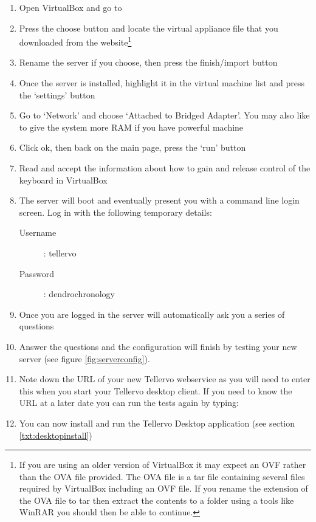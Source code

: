 \begin{enumerate}
 \item Open VirtualBox and go to 
 \item Press the choose button and locate the virtual appliance file that you downloaded from the website\footnote{If you are using an older version of VirtualBox it may expect an OVF rather than the OVA file provided.  The OVA file is a tar file containing several files required by VirtualBox including an OVF file.  If you rename the extension of the OVA file to tar then extract the contents to a folder using a tools like WinRAR you should then be able to continue.}
 \item Rename the server if you choose, then press the finish/import button
 \item Once the server is installed, highlight it in the virtual machine list and press the `settings' button
 \item Go to `Network' and choose `Attached to Bridged Adapter'.  You may also like to give the system more RAM if you have powerful machine
 \item Click ok, then back on the main page, press the `run' button
 \item Read and accept the information about how to gain and release control of the keyboard in VirtualBox
 \item The server will boot and eventually present you with a command line login screen.  Log in with the following temporary details:
    \begin{description}
      \item[Username] : tellervo
      \item[Password] : dendrochronology
    \end{description}
 \item Once you are logged in the server will automatically ask you a series of questions 
 \item Answer the questions and the configuration will finish by testing your new server (see figure \ref{fig:serverconfig}). 
 \item Note down the URL of your new Tellervo webservice as you will need to enter this when you start your Tellervo desktop client.  If you need to know the URL at a later date you can run the tests again by typing: 
 \item You can now install and run the Tellervo Desktop application (see section \ref{txt:desktopinstall})
\end{enumerate}

